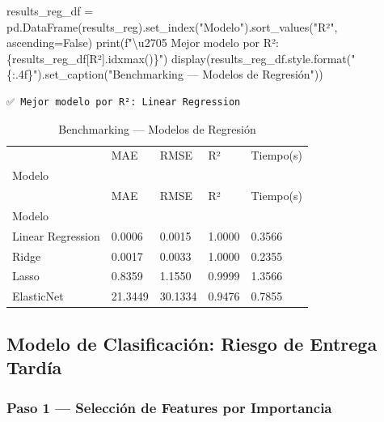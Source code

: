 \documentclass[
  letterpaper,
  DIV=11,
  numbers=noendperiod]{scrartcl}
\newenvironment{Shaded}{\begin{snugshade}}{\end{snugshade}}
\newcommand{\BuiltInTok}[1]{\textcolor[rgb]{0.00,0.23,0.31}{#1}}
\newcommand{\CharTok}[1]{\textcolor[rgb]{0.13,0.47,0.30}{#1}}
\newcommand{\NormalTok}[1]{\textcolor[rgb]{0.00,0.23,0.31}{#1}}
\newcommand{\OperatorTok}[1]{\textcolor[rgb]{0.37,0.37,0.37}{#1}}
\newcommand{\SpecialCharTok}[1]{\textcolor[rgb]{0.37,0.37,0.37}{#1}}
\newcommand{\SpecialStringTok}[1]{\textcolor[rgb]{0.13,0.47,0.30}{#1}}
\newcommand{\StringTok}[1]{\textcolor[rgb]{0.13,0.47,0.30}{#1}}
\newcommand{\VariableTok}[1]{\textcolor[rgb]{0.07,0.07,0.07}{#1}}
\begin{document}
\begin{Shaded}
\begin{Highlighting}[]
\NormalTok{results\_reg\_df }\OperatorTok{=}\NormalTok{ pd.DataFrame(results\_reg).set\_index(}\StringTok{"Modelo"}\NormalTok{).sort\_values(}\StringTok{"R²"}\NormalTok{, ascending}\OperatorTok{=}\VariableTok{False}\NormalTok{)}
\BuiltInTok{print}\NormalTok{(}\SpecialStringTok{f"}\CharTok{\textbackslash{}u2705}\SpecialStringTok{ Mejor modelo por R²: }\SpecialCharTok{\{}\NormalTok{results\_reg\_df[}\StringTok{\textquotesingle{}R²\textquotesingle{}}\NormalTok{]}\SpecialCharTok{.}\NormalTok{idxmax()}\SpecialCharTok{\}}\SpecialStringTok{"}\NormalTok{)}
\NormalTok{display(results\_reg\_df.style.}\BuiltInTok{format}\NormalTok{(}\StringTok{"}\SpecialCharTok{\{:.4f\}}\StringTok{"}\NormalTok{).set\_caption(}\StringTok{"Benchmarking — Modelos de Regresión"}\NormalTok{))}
\end{Highlighting}
\end{Shaded}

\begin{verbatim}
✅ Mejor modelo por R²: Linear Regression
\end{verbatim}

\protect{}\label{regression-model}
\begin{longtable}[]{@{}lllll@{}}
\caption{Benchmarking --- Modelos de
Regresión}\label{T_a6051}\tabularnewline
\toprule\noalign{}
~ & MAE & RMSE & R² & Tiempo(s) \\
Modelo & ~ & ~ & ~ & ~ \\
\midrule\noalign{}
\endfirsthead
\toprule\noalign{}
~ & MAE & RMSE & R² & Tiempo(s) \\
Modelo & ~ & ~ & ~ & ~ \\
\midrule\noalign{}
\endhead
\bottomrule\noalign{}
\endlastfoot
Linear Regression & 0.0006 & 0.0015 & 1.0000 & 0.3566 \\
Ridge & 0.0017 & 0.0033 & 1.0000 & 0.2355 \\
Lasso & 0.8359 & 1.1550 & 0.9999 & 1.3566 \\
ElasticNet & 21.3449 & 30.1334 & 0.9476 & 0.7855 \\
\end{longtable}

\subsection{Modelo de Clasificación: Riesgo de Entrega
Tardía}\label{modelo-de-clasificaciuxf3n-riesgo-de-entrega-tarduxeda}

\subsubsection{Paso 1 --- Selección de Features por
Importancia}\label{paso-1-selecciuxf3n-de-features-por-importancia}
\end{document}
